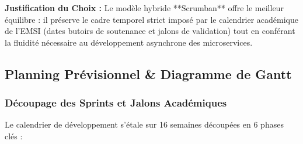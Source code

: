 \documentclass[11pt,a4paper,titlepage]{article}
\begin{document}
\noindent\textbf{Justification du Choix :} Le modèle hybride **Scrumban** offre le meilleur équilibre : il préserve le cadre temporel strict imposé par le calendrier académique de l'EMSI (dates butoirs de soutenance et jalons de validation) tout en conférant la fluidité nécessaire au développement asynchrone des microservices.

\newpage
\subsection{Planning Prévisionnel \& Diagramme de Gantt}

\subsubsection{Découpage des Sprints et Jalons Académiques}
Le calendrier de développement s'étale sur 16 semaines découpées en 6 phases clés :
\end{document}
